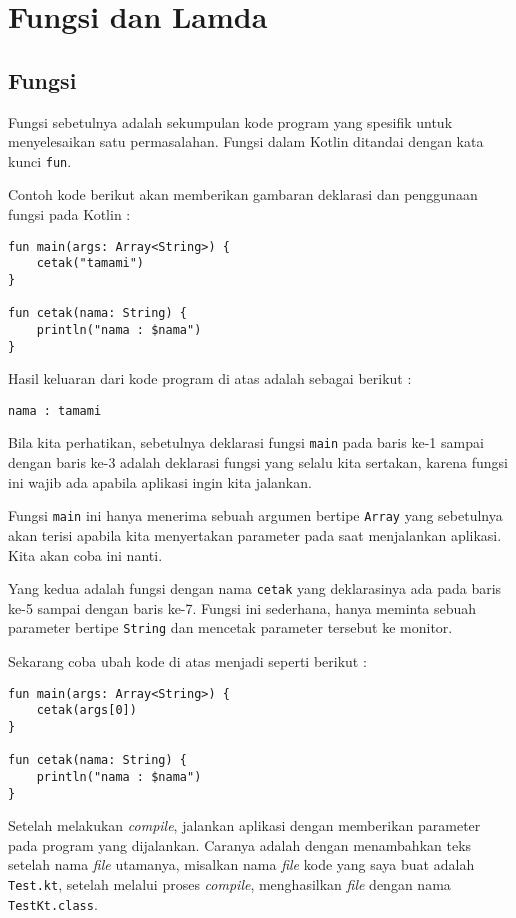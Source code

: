 \chapter{Fungsi dan Lamda}

\section{Fungsi}

Fungsi sebetulnya adalah sekumpulan kode program yang spesifik untuk menyelesaikan satu permasalahan. Fungsi dalam Kotlin ditandai dengan kata kunci \texttt{fun}.

Contoh kode berikut akan memberikan gambaran deklarasi dan penggunaan fungsi pada Kotlin :

\begin{lstlisting}
fun main(args: Array<String>) {
	cetak("tamami")
}

fun cetak(nama: String) {
	println("nama : $nama")
}
\end{lstlisting}

Hasil keluaran dari kode program di atas adalah sebagai berikut :

\begin{lstlisting}
nama : tamami
\end{lstlisting}

Bila kita perhatikan, sebetulnya deklarasi fungsi \texttt{main} pada baris ke-1 sampai dengan baris ke-3 adalah deklarasi fungsi yang selalu kita sertakan, karena fungsi ini wajib ada apabila aplikasi ingin kita jalankan.

Fungsi \texttt{main} ini hanya menerima sebuah argumen bertipe \texttt{Array} yang sebetulnya akan terisi apabila kita menyertakan parameter pada saat menjalankan aplikasi. Kita akan coba ini nanti.

Yang kedua adalah fungsi dengan nama \texttt{cetak} yang deklarasinya ada pada baris ke-5 sampai dengan baris ke-7. Fungsi ini sederhana, hanya meminta sebuah parameter bertipe \texttt{String} dan mencetak parameter tersebut ke monitor.

Sekarang coba ubah kode di atas menjadi seperti berikut :

\begin{lstlisting}
fun main(args: Array<String>) {
	cetak(args[0])
}

fun cetak(nama: String) {
	println("nama : $nama")
}
\end{lstlisting}

Setelah melakukan \textit{compile}, jalankan aplikasi dengan memberikan parameter pada program yang dijalankan. Caranya adalah dengan menambahkan teks setelah nama \textit{file} utamanya, misalkan nama \textit{file} kode yang saya buat adalah \texttt{Test.kt}, setelah melalui proses \textit{compile}, menghasilkan \textit{file} dengan nama \texttt{TestKt.class}.

